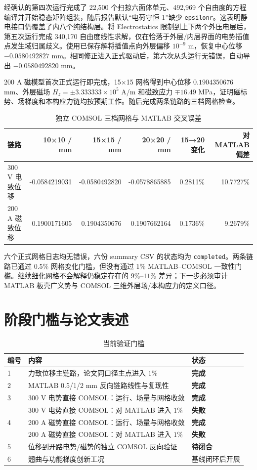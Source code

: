 \documentclass[UTF8,fontset=windows,11pt,a4paper]{ctexart}
\newcommand{\pass}{\textcolor{ok}{\textbf{完成}}}
\newcommand{\wait}{\textcolor{pending}{\textbf{待闭合}}}
\newcommand{\failure}{\textcolor{bad}{\textbf{失败}}}
\begin{document}
经确认的第四次运行完成了 22,500 个扫掠六面体单元、492,969 个自由度的方程编译并开始稳态矩阵组装，随后报告默认“电荷守恒 1”缺少 \texttt{epsilonr}。这表明静电接口仍覆盖了内八个纯结构层。将 Electrostatics 限制到上下两个外压电层后，第五次运行完成 340,170 自由度线性求解，仅在恰落于外层/内层界面的电势插值点发生域归属歧义。使用已保存解将插值点向外层偏移 $10^{-9}$ m，恢复中心位移 $-0.0580492827$ mm。相同修正进入正式驱动后，第六次从头运行无错误，自动导出 $-0.0580492820$ mm。

200 A 磁模型首次正式运行即完成，15×15 网格得到中心位移 $0.1904350676$ mm、外层磁场 $H_z=\pm3.333333\times10^5$ A/m 和磁致应力 $\mp16.49$ MPa，证明磁标势、场梯度和本构应力链均按预期工作。随后完成两条链路的三档网格检查。

\begin{table}[H]
\centering
\caption{独立 COMSOL 三档网格与 MATLAB 交叉误差}
\small
\begin{tabular}{lrrrrr}
\toprule
链路 & 10×10 / mm & 15×15 / mm & 20×20 / mm & 15→20 变化 & 对 MATLAB 偏差 \\
\midrule
300 V 电致位移 & -0.0584219031 & -0.0580492820 & -0.0578865885 & 0.2811\% & 10.7727\% \\
200 A 磁致位移 &  0.1900171605 &  0.1904350676 &  0.1907662164 & 0.1736\% &  9.2679\% \\
\bottomrule
\end{tabular}
\end{table}

六个正式网格日志均无错误，六份 summary CSV 的状态均为 \texttt{completed}。两条链路已通过 $0.5\%$ 网格变化门槛，但没有通过 $1\%$ MATLAB--COMSOL 一致性门槛。继续细化网格不会解释仍稳定存在的 $9\%$--$11\%$ 差异；下一步必须审计 MATLAB 板壳广义势与 COMSOL 三维外层场/本构应力的定义口径。

\section{阶段门槛与论文表述}
\begin{table}[H]
\centering
\caption{当前验证门槛}
\begin{tabularx}{\textwidth}{lXl}
\toprule
编号 & 内容 & 状态 \\
\midrule
1 & 力致位移主链路，论文同口径主点进入 $1\%$ & \pass \\
2 & MATLAB 0.5/1/2 mm 反向链路线性与复现性 & \pass \\
3 & 300 V 电势直接 COMSOL：运行、场量与网格收敛 & \pass \\
  & 300 V 电势直接 COMSOL：对 MATLAB 进入 $1\%$ & \failure \\
4 & 200 A 磁势直接 COMSOL：运行、场量与网格收敛 & \pass \\
  & 200 A 磁势直接 COMSOL：对 MATLAB 进入 $1\%$ & \failure \\
5 & 位移到开路电势/磁势的独立 COMSOL 反向验证 & \wait \\
6 & 翘曲与功能梯度创新工况 & 基线闭环后开展 \\
\bottomrule
\end{tabularx}
\end{table}
\end{document}
